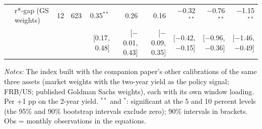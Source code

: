 \begin{table}[tp]
{\begin{tabular}{llcrrrrrrr}
 & r*-gap (GS weights) & 12 & 623 & 0.35$^{**}$ & 0.26 & 0.16 & $-$0.32$^{**}$ & $-$0.76$^{**}$ & $-$1.15$^{**}$\\
 & & & & {\scriptsize [0.17, 0.48]} & {\scriptsize [$-$0.01, 0.43]} & {\scriptsize [$-$0.09, 0.35]} & {\scriptsize [$-$0.42, $-$0.15]} & {\scriptsize [$-$0.96, $-$0.36]} & {\scriptsize [$-$1.46, $-$0.49]}\\
\bottomrule\end{tabular}}
\begin{flushleft}\footnotesize\textit{Notes:} The index built with the companion paper's other calibrations of the same three assets (market weights with the two-year yield as the policy signal; FRB/US; published Goldman Sachs weights), each with its own window loading. Per +1 pp on the 2-year yield. $^{**}$ and $^{*}$: significant at the 5 and 10 percent levels (the 95\% and 90\% bootstrap intervals exclude zero); 90\% intervals in brackets. Obs = monthly observations in the equations.\end{flushleft}
\end{table}
